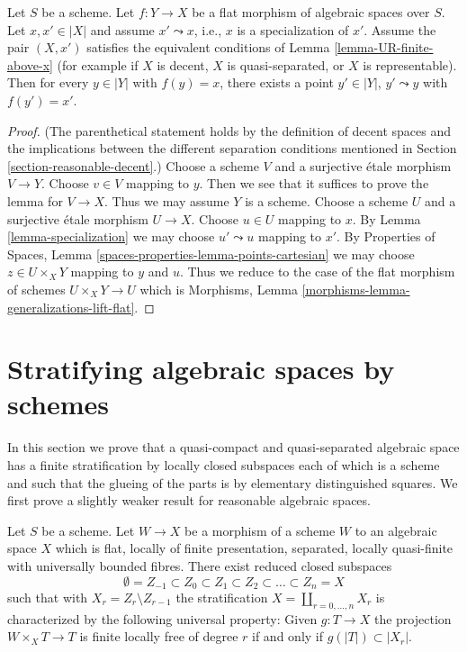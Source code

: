 \begin{lemma}
\label{lemma-generalizations-lift-flat}
Let $S$ be a scheme. Let $f : Y \to X$ be a  flat morphism of algebraic spaces
over $S$. Let $x, x' \in |X|$ and assume $x' \leadsto x$, i.e., $x$ is a
specialization of $x'$. Assume the pair $(X, x')$ satisfies the equivalent
conditions of Lemma \ref{lemma-UR-finite-above-x} (for example if
$X$ is decent, $X$ is quasi-separated, or $X$ is representable).
Then for every $y \in |Y|$ with $f(y) = x$, there exists a point $y' \in |Y|$,
$y' \leadsto y$ with $f(y') = x'$.
\end{lemma}

\begin{proof}
(The parenthetical statement holds by the definition of decent spaces
and the implications between the different separation conditions
mentioned in Section \ref{section-reasonable-decent}.)
Choose a scheme $V$ and a surjective \'etale morphism $V \to Y$.
Choose $v \in V$ mapping to $y$. Then we see that it suffices to
prove the lemma for $V \to X$. Thus we may assume $Y$ is a scheme.
Choose a scheme $U$ and a surjective \'etale morphism $U \to X$.
Choose $u \in U$ mapping to $x$. By Lemma \ref{lemma-specialization}
we may choose $u' \leadsto u$ mapping to $x'$. By
Properties of Spaces, Lemma \ref{spaces-properties-lemma-points-cartesian}
we may choose $z \in U \times_X Y$ mapping to $y$ and $u$.
Thus we reduce to the case of the flat morphism of
schemes $U \times_X Y \to U$ which is
Morphisms, Lemma \ref{morphisms-lemma-generalizations-lift-flat}.
\end{proof}






\section{Stratifying algebraic spaces by schemes}
\label{section-stratifications}

\noindent
In this section we prove that a quasi-compact and quasi-separated
algebraic space has a finite stratification by locally closed subspaces
each of which is a scheme and such that the glueing of the parts is by
elementary distinguished squares. We first prove a slightly weaker
result for reasonable algebraic spaces.

\begin{lemma}
\label{lemma-quasi-compact-reasonable-stratification}
Let $S$ be a scheme. Let $W \to X$ be a morphism of a scheme $W$
to an algebraic space $X$ which is flat, locally of finite presentation,
separated, locally quasi-finite with universally bounded fibres. There exist
reduced closed subspaces
$$
\emptyset = Z_{-1} \subset Z_0 \subset Z_1 \subset Z_2 \subset
\ldots \subset Z_n = X
$$
such that with $X_r = Z_r \setminus Z_{r - 1}$ the stratification
$X = \coprod_{r = 0, \ldots, n} X_r$ is characterized by the following
universal property: Given $g : T \to X$ the projection
$W \times_X T \to T$ is finite locally free of degree $r$ if and only if
$g(|T|) \subset |X_r|$.
\end{lemma}


